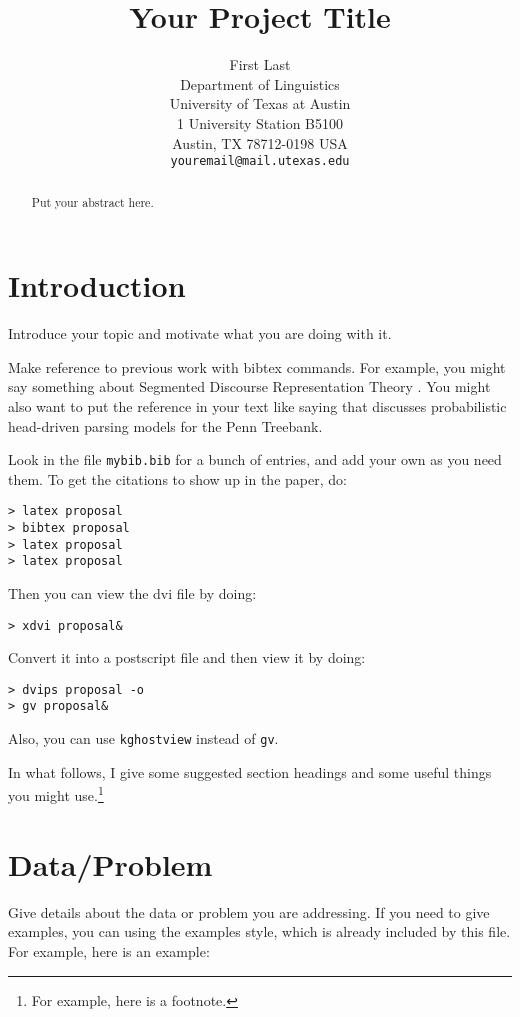 \documentclass[11pt]{article}
\title{Your Project Title}
\author{}
\author{First Last\\
Department of Linguistics\\
University of Texas at Austin\\
1 University Station B5100\\
Austin, TX 78712-0198 USA\\
{\tt youremail@mail.utexas.edu}}
\date{}
\begin{document}
\maketitle

\begin{abstract}
  Put your abstract here.
\end{abstract}


\section{Introduction}

Introduce your topic and motivate what you are doing with it.

Make reference to previous work with bibtex commands. For example, you
might say something about Segmented Discourse Representation Theory
\citep{asher:lascarides:2003}. You might also want to put the
reference in your text like saying that \cite{collins:2003}
discusses probabilistic head-driven parsing models for the Penn
Treebank.

Look in the file \verb+mybib.bib+ for a bunch of entries, and add your
own as you need them. To get the citations to show up in the paper, do:

\begin{verbatim}
> latex proposal
> bibtex proposal
> latex proposal
> latex proposal
\end{verbatim}

Then you can view the dvi file by doing:

\begin{verbatim}
> xdvi proposal&
\end{verbatim}

Convert it into a postscript file and then view it by doing:

\begin{verbatim}
> dvips proposal -o
> gv proposal&
\end{verbatim}

Also, you can use \verb+kghostview+ instead of \verb+gv+.

In what follows, I give some suggested section headings and some
useful things you might use.\footnote{For example, here is a
footnote.}


\section{Data/Problem}

Give details about the data or problem you are addressing. If you need
to give examples, you can using the examples style, which is already
included by this file. For example, here is an example:
\end{document}
